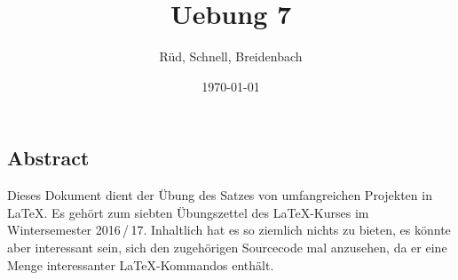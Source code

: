 \documentclass{scrreprt}
\begin{document}
\author{Rüd, Schnell, Breidenbach}
\title{Uebung 7}
\date{\today}
\maketitle

\subsection*{Abstract}
Dieses Dokument dient der Übung des Satzes von umfangreichen Projekten in \LaTeX{}. Es gehört zum siebten Übungszettel des \LaTeX-Kurses im Wintersemester 2016\,/\,17. Inhaltlich hat es so ziemlich nichts zu bieten, es könnte aber interessant sein, sich den zugehörigen Sourcecode mal anzusehen, da er eine Menge interessanter \LaTeX-Kommandos enthält.






\printindex
\renewcommand{\listfigurename}{Liste der Abbildungen}
\renewcommand{\listtablename}{Liste der Tabellen}
\listoffigures
\listoftables
\end{document}
